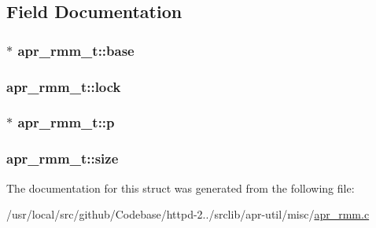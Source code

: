 \subsection{Field Documentation}
\subsubsection[{\texorpdfstring{base}{base}}]{$\ast$ apr\+\_\+rmm\+\_\+t\+::base}\hypertarget{structapr__rmm__t_a28016cd2f4134f761b84b24f26e33c8c}{}\label{structapr__rmm__t_a28016cd2f4134f761b84b24f26e33c8c}
\subsubsection[{\texorpdfstring{lock}{lock}}]{ apr\+\_\+rmm\+\_\+t\+::lock}\hypertarget{structapr__rmm__t_a7767aedf2151e1c0f80aa24048456e7d}{}\label{structapr__rmm__t_a7767aedf2151e1c0f80aa24048456e7d}
\subsubsection[{\texorpdfstring{p}{p}}]{$\ast$ apr\+\_\+rmm\+\_\+t\+::p}\hypertarget{structapr__rmm__t_a59ee53b889389c4108b9cc5138920bb4}{}\label{structapr__rmm__t_a59ee53b889389c4108b9cc5138920bb4}
\subsubsection[{\texorpdfstring{size}{size}}]{ apr\+\_\+rmm\+\_\+t\+::size}\hypertarget{structapr__rmm__t_a1849cd58933be54944b0881de95f99e4}{}\label{structapr__rmm__t_a1849cd58933be54944b0881de95f99e4}


The documentation for this struct was generated from the following file\+:\begin{DoxyCompactItemize}
\item 
/usr/local/src/github/\+Codebase/httpd-\/2../srclib/apr-\/util/misc/\hyperlink{apr__rmm_8c}{apr\+\_\+rmm.\+c}\end{DoxyCompactItemize}
